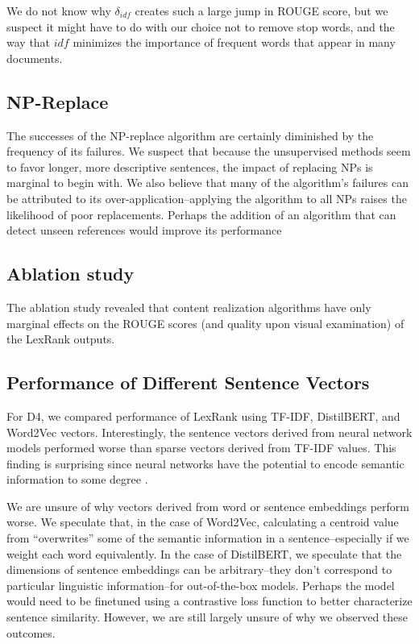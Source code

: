 We do not know why $\delta_{idf}$ creates such a large jump in ROUGE score, but we suspect it might have to do with our choice not to remove stop words, and the way that $idf$ minimizes the importance of frequent words that appear in many documents. 

\subsection{NP-Replace}

The successes of the NP-replace algorithm are certainly diminished by the frequency of its failures. We suspect that because the unsupervised methods seem to favor longer, more descriptive sentences, the impact of replacing NPs is marginal to begin with. We also believe that many of the algorithm's failures can be attributed to its over-application--applying the algorithm to all NPs raises the likelihood of poor replacements. Perhaps the addition of an algorithm that can detect unseen references would improve its performance

\subsection{Ablation study}

The ablation study revealed that content realization algorithms have only marginal effects on the ROUGE scores (and quality upon visual examination) of the LexRank outputs. 

\subsection{Performance of Different Sentence Vectors}

For D4, we compared performance of LexRank using TF-IDF, DistilBERT, and Word2Vec vectors. Interestingly, the sentence vectors derived from neural network models performed worse than sparse vectors derived from TF-IDF values. This finding is surprising since neural networks have the potential to encode semantic information to some degree \cite{mikolov2013-word2vec}. 

We are unsure of why vectors derived from word or sentence embeddings perform worse. We speculate that, in the case of Word2Vec, calculating a centroid value from ``overwrites'' some of the semantic information in a sentence--especially if we weight each word equivalently. In the case of DistilBERT, we speculate that the dimensions of sentence embeddings can be arbitrary--they don't correspond to particular linguistic information--for out-of-the-box models. Perhaps the model would need to be finetuned using a contrastive loss function to better characterize sentence similarity. However, we are still largely unsure of why we observed these outcomes.

